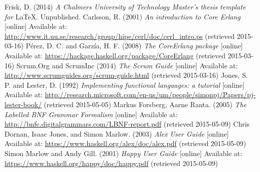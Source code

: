 \begin{thebibliography}{69}

 Frisk, D. (2014) \textit{A Chalmers University of Technology Master's thesis template for} \LaTeX . Unpublished.
 Carlsson, R. (2001) \textit{An introduction to Core Erlang} [online] Available at: \url{http://www.it.uu.se/research/group/hipe/cerl/doc/cerl_intro.ps} (retrieved 2015-03-16)
 Pérez, D. C. and Garzía, H. F. (2008) \textit{The CoreErlang package} [online] Available at: \url{https://hackage.haskell.org/package/CoreErlang} (retrieved 2015-03-16)
 Scrum.Org and ScrumInc (2014) \textit{The Scrum Guide} [online] Available at: \url{http://www.scrumguides.org/scrum-guide.html} (retrieved 2015-03-16)
 Jones, S. P. and Lester, D. (1992) \textit{Implementing functional languages: a tutorial} [online] Available at: \url{http://research.microsoft.com/en-us/um/people/simonpj/Papers/pj-lester-book/} (retrieved 2015-05-05)
 Markus Forsberg, Aarne Ranta. (2005) \textit{The Labelled BNF Grammar Formalism} [online] Available at: \url{http://bnfc.digitalgrammars.com/LBNF-report.pdf} (retrieved 2015-05-09)
 Chris Dornan, Isaac Jones, and Simon Marlow. (2003) \textit{Alex User Guide} [online] Available at: \url{https://www.haskell.org/alex/doc/alex.pdf} (retrieved 2015-05-09)
 Simon Marlow and Andy Gill. (2001) \textit{Happy User Guide} [online] Available at: \url{https://www.haskell.org/happy/doc/happy.pdf} (retrieved 2015-05-09)

\end{thebibliography}

